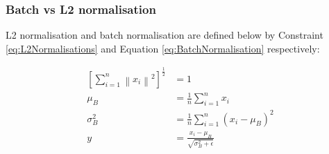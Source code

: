 \documentclass[12pt,onecolumn,letterpaper]{article}
\begin{document}
\subsubsection{Batch vs L2 normalisation}
\label{sec:BatchVsL2Normalisation}

L2 normalisation and batch normalisation are defined below by Constraint \ref{eq:L2Normalisations} and Equation \ref{eq:BatchNormalisation} respectively:

\begin{subequations}
\begin{align}
   \left[\sum_{i=1}^{n}\left \| x_i \right \|^2\right]^{\frac{1}{2}} &= 1 \label{eq:L2Normalisations}\\
   \mu_B &= \frac{1}{n} \sum_{i=1}^{n}x_i \nonumber\\
   \sigma_B^2 &= \frac{1}{n} \sum_{i=1}^{n} \left(x_i - \mu_B \right)^2 \nonumber\\
   y &= \frac{x_i - \mu_B}{\sqrt{\sigma_B^2 + \epsilon}}
   \label{eq:BatchNormalisation}
\end{align}
\end{subequations}
\end{document}
